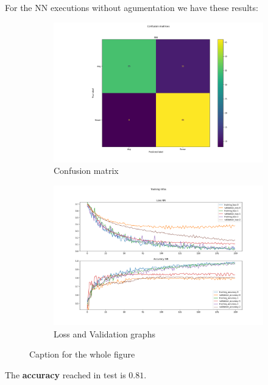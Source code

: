 \documentclass{report}
\begin{document}
\pagebreak

For the NN executions without agumentation we have these results:
\begin{figure}[t!]
  \centering
  \hspace{-2cm}
  \begin{subfigure}[t]{0.49\textwidth}
    \centering
    \includegraphics[width=1.3\textwidth]{2.senza_augmentationNN/conf_mat.png}
    \caption{Confusion matrix}
    \label{fig:image-set3-sub1}
  \end{subfigure}
  \hspace{-0.5cm}
  \begin{subfigure}[t]{0.49\textwidth}
    \centering
    \includegraphics[width=1.3\textwidth]{2.senza_augmentationNN/training_infos.png}
    \caption{Loss and Validation graphs}
    \label{fig:image-set3-sub2}
  \end{subfigure}

  \caption{Caption for the whole figure}
  \label{fig:image-set3}
\end{figure}
The \textbf{accuracy} reached in test is $0.81$.\\
\end{document}
